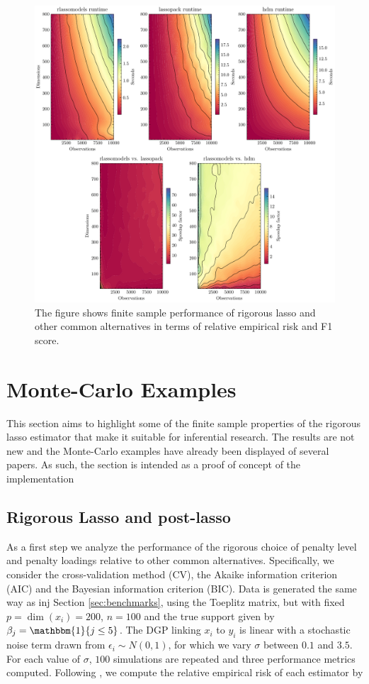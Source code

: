 \documentclass[11pt, reqno]{amsart} \usepackage{pstricks} %
\begin{document}
\begin{figure}[h]
  \centering
  \includegraphics[width=\textwidth]{../outputs/figs/runtime-benchmark.pdf}
  \caption{The figure shows finite sample performance of rigorous lasso and
    other common alternatives in terms of relative empirical risk and F1 score.}
  \label{fig:rlasso-performance}
\end{figure}


\section{Monte-Carlo Examples}

This section aims to highlight some of the finite sample properties of the
rigorous lasso estimator that make it suitable for inferential research. The
results are not new and the Monte-Carlo examples have already been displayed of
several papers. As such, the section is intended as a proof of concept of the
implementation 

\subsection{Rigorous Lasso and post-lasso} As a first step we analyze the
performance of the rigorous choice of penalty level and penalty loadings
relative to other common alternatives. Specifically, we consider the
cross-validation method (CV), the Akaike information criterion (AIC) and the
Bayesian information criterion (BIC). Data is generated the same way as inj
Section \ref{sec:benchmarks}, using the Toeplitz matrix, but with fixed $p =
\dim(x_i) = 200$, $n=100$ and the true support given by $\beta_j = \mathbbm{1}\{j
\leq 5\}$. The DGP linking $x_i$ to $y_i$ is linear with a stochastic noise
term drawn from $\epsilon_i \sim N(0, 1)$, for which we vary $\sigma$ between $0.1$
and $3.5$. For each value of $\sigma$, $100$ simulations are repeated and three
performance metrics computed. Following \cite{Belloni2011}, we compute the
relative empirical risk of each estimator by 
\end{document}
